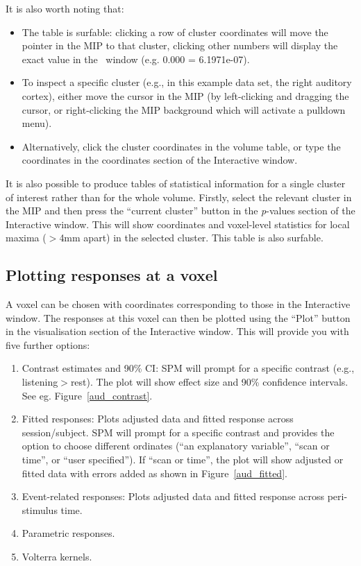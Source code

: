It is also worth noting that:

\begin{itemize}
\item The table is surfable: clicking a row of cluster coordinates will move the pointer in the MIP to that cluster, clicking other numbers will display the exact value in the \matlab\ window (e.g. 0.000 = 6.1971e-07).
\item To inspect a specific cluster (e.g., in this example data set, the right auditory cortex), either move the cursor in the MIP (by left-clicking and dragging the cursor, or right-clicking the MIP background which will activate a pulldown menu).
\item Alternatively, click the cluster coordinates in the volume table, or type the coordinates in the coordinates section of the Interactive window.
\end{itemize}

It is also possible to produce tables of statistical information for a single cluster of interest rather than for the whole volume. Firstly, select the relevant cluster in the MIP and then press the ``current cluster'' button in the \textit{p}-values section of the Interactive window. This will show coordinates and voxel-level statistics for local maxima ($>$4mm apart) in the selected cluster. This table is also surfable.

\subsection{Plotting responses at a voxel}

A voxel can be chosen with coordinates corresponding to those in the Interactive window. The responses at this voxel can then be plotted using the ``Plot'' button in the visualisation section of the Interactive window. This will provide you with five further options:

\begin{enumerate}
\item Contrast estimates and 90\% CI: SPM will prompt for a specific contrast (e.g., listening$>$rest). The plot will show effect size and 90\% confidence intervals. See eg. Figure~\ref{aud_contrast}.
\item Fitted responses: Plots adjusted data and fitted response across session/subject. SPM will prompt for a specific contrast and provides the option to choose different ordinates (``an explanatory variable'', ``scan or time'', or ``user specified''). If ``scan or time'', the plot will show adjusted or fitted data with errors added as shown in Figure~\ref{aud_fitted}.
\item Event-related responses: Plots adjusted data and fitted response across peri-stimulus time.
\item Parametric responses.
\item Volterra kernels.
\end{enumerate}

